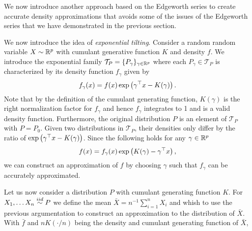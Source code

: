 We now introduce another approach based on the Edgeworth series to create accurate density approximations that avoids some of the issues of the Edgeworth series that we have demonstrated in the previous section.

We now introduce the idea of \textit{exponential tilting}. Consider a random random variable $X \sim {\mathbb{R}^p}$ with cumulant generative function $K$ and density $f$. We introduce the exponential family $\mathcal{T}_P = \{ P_\gamma \}_{\gamma \in {\mathbb{R}^p}}$ where each $P_\gamma \in \mathcal{T}_P$ is characterized by its density function $f_\gamma$ given by
\begin{equation*}
    f_\gamma(x) = f(x)\exp\left(\gamma^\top x - K(\gamma)\right).
\end{equation*}
Note that by the definition of the cumulant generating function, $K(\gamma)$ is the right normalization factor for $f_\gamma$ and hence $f_\gamma$ integrates to 1 and is a valid density function. Furthermore, the original distribution $P$ is an element of $\mathcal{T}_P$ with $P = P_0$. Given two distributions in $\mathcal{T}_P$, their densities only differ by the ratio of $\exp\left(\gamma^\top x - K(\gamma)\right)$. Since the following holds for any $\gamma \in {\mathbb{R}^p}$
\begin{equation}
    f(x) = f_\gamma(x)\exp\left(K(\gamma) - \gamma^\top x\right),
\end{equation}
we can construct an approximation of $f$ by choosing $\gamma$ such that $f_\gamma$ can be accurately approximated.

Let us now consider a distribution $P$ with cumulant generating function $K$. For $X_1, \ldots X_n \stackrel{iid}{\sim} P$ we define the mean $\bar X = n^{-1}\sum_{i=1}^n X_i$ and whish to use the previous argumentation to construct an approximation to the distribution of $\bar X$. With $\bar f$ and $n K(\cdot / n)$ being the density and cumulant generating function of $\bar X$, 